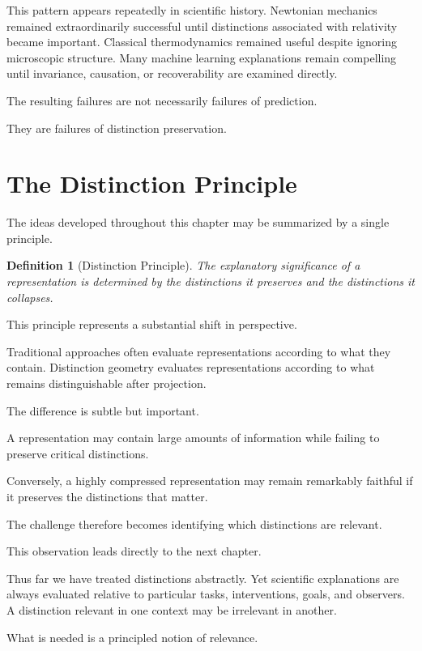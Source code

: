 \documentclass[11pt,oneside,openany]{book}
\newtheorem{definition}{Definition}[chapter] \newtheorem{theorem}{Theorem}[chapter] \newtheorem{proposition}{Proposition}[chapter] \newtheorem{lemma}{Lemma}[chapter] \newtheorem{corollary}{Corollary}[chapter] \newtheorem{remark}{Remark}[chapter]
\begin{document}
This pattern appears repeatedly in scientific history. Newtonian mechanics remained extraordinarily successful until distinctions associated with relativity became important. Classical thermodynamics remained useful despite ignoring microscopic structure. Many machine learning explanations remain compelling until invariance, causation, or recoverability are examined directly.

The resulting failures are not necessarily failures of prediction.

They are failures of distinction preservation.

\section{The Distinction Principle}

The ideas developed throughout this chapter may be summarized by a single principle.

\begin{definition}[Distinction Principle]

The explanatory significance of a representation is determined by the distinctions it preserves and the distinctions it collapses.

\end{definition}

This principle represents a substantial shift in perspective.

Traditional approaches often evaluate representations according to what they contain. Distinction geometry evaluates representations according to what remains distinguishable after projection.

The difference is subtle but important.

A representation may contain large amounts of information while failing to preserve critical distinctions.

Conversely, a highly compressed representation may remain remarkably faithful if it preserves the distinctions that matter.

The challenge therefore becomes identifying which distinctions are relevant.

This observation leads directly to the next chapter.

Thus far we have treated distinctions abstractly. Yet scientific explanations are always evaluated relative to particular tasks, interventions, goals, and observers. A distinction relevant in one context may be irrelevant in another.

What is needed is a principled notion of relevance.
\end{document}
